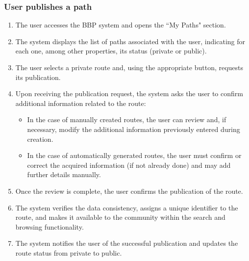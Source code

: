 \subsubsection*{User publishes a path}
\begin{enumerate}
    \item The user accesses the BBP system and opens the “My Paths" section.
    \item The system displays the list of paths associated with the user, indicating for each one, among other properties, its status (private or public).
    \item The user selects a private route and, using the appropriate button, requests its publication.
    \item Upon receiving the publication request, the system asks the user to confirm additional information related to the route:
        \begin{itemize}
            \item In the case of manually created routes, the user can review and, if necessary, modify the additional information previously entered during creation.
            \item In the case of automatically generated routes, the user must confirm or correct the acquired information (if not already done) and may add further details manually.
        \end{itemize}
    \item Once the review is complete, the user confirms the publication of the route.
    \item The system verifies the data consistency, assigns a unique identifier to the route, and makes it available to the community within the search and browsing functionality.
    \item The system notifies the user of the successful publication and updates the route status from private to public.
\end{enumerate}
